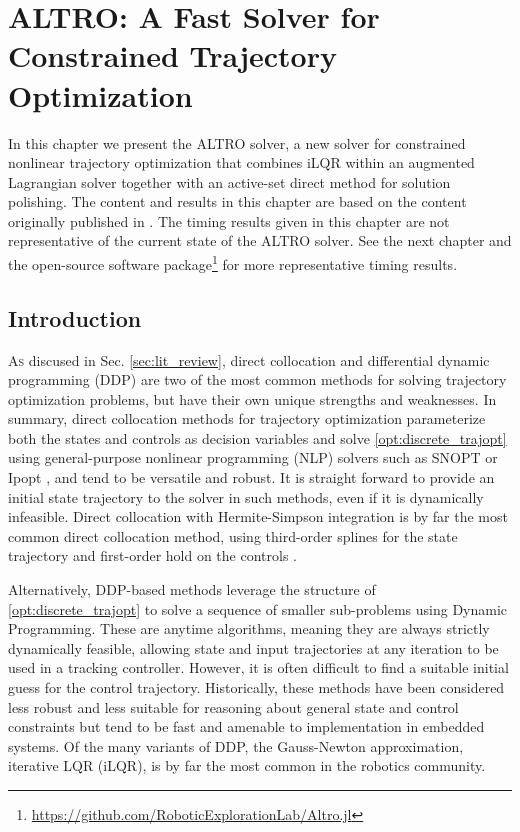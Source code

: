 \documentclass[../root.tex]{subfiles}
\begin{document}
\chapter[ALTRO]{ALTRO: A Fast Solver for Constrained Trajectory Optimization} \label{chap:altro}
In this chapter we present the ALTRO solver, a new solver for constrained 
nonlinear trajectory optimization that combines iLQR within an augmented 
Lagrangian solver together with an active-set direct method for solution 
polishing. The content and results in this chapter are based on the content
originally published in \cite{howell_ALTRO_2019}. The timing results given 
in this chapter are not representative of the current state of the ALTRO solver.
See the next chapter and the open-source software 
package\footnote{\url{https://github.com/RoboticExplorationLab/Altro.jl}} 
for more representative timing results.

\section{Introduction}

\lettrine{A}{s} discused in Sec. \ref{sec:lit_review}, direct collocation and
differential dynamic programming (DDP) are two of the most common methods for
solving trajectory optimization problems, but have their own unique strengths
and weaknesses. In summary, direct collocation methods for trajectory
optimization parameterize both the states and controls as decision variables
and solve \eqref{opt:discrete_trajopt} using general-purpose nonlinear
programming (NLP) solvers such as SNOPT \cite{gill_SNOPT_2005} or Ipopt
\cite{wachter_Implementation_2006}, and tend to be versatile and robust. It
is straight forward to provide an initial state trajectory to the solver in
such methods, even if it is dynamically infeasible. Direct collocation with
Hermite-Simpson integration is by far the most common direct collocation
method, using third-order splines for the state trajectory and first-order
hold on the controls \cite{hargraves_Direct_1987}.

Alternatively, DDP-based methods leverage the structure of
\eqref{opt:discrete_trajopt} to solve a sequence of smaller sub-problems using
Dynamic Programming. These are anytime algorithms, meaning they are always
strictly dynamically feasible, allowing state and input trajectories at any
iteration to be used in a tracking controller. However, it is often difficult
to find a suitable initial guess for the control trajectory. Historically,
these methods have been considered less robust and less suitable for
reasoning about general state and control constraints but tend to be fast and
amenable to implementation in embedded systems. Of the many variants of DDP,
the Gauss-Newton approximation, iterative LQR (iLQR), is by far the most common
in the robotics community. 
\end{document}
